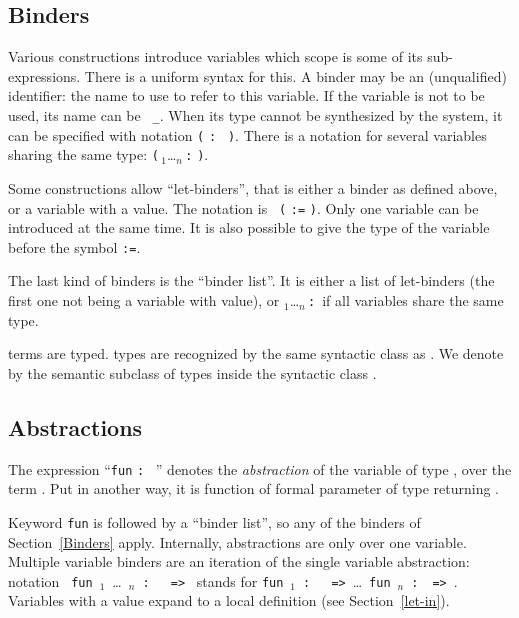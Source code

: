 \subsection{Binders
\label{Binders}
}

Various constructions introduce variables which scope is some of its
sub-expressions. There is a uniform syntax for this. A binder may be
an (unqualified) identifier: the name to use to refer to this
variable. If the variable is not to be used, its name can be {\tt
\_}. When its type cannot be synthesized by the system, it can be
specified with notation {\tt (}\,{\ident}\,{\tt :}\,{\type}\,{\tt
)}. There is a notation for several variables sharing the same type:
{\tt (}\,{\ident$_1$}\ldots{\ident$_n$}\,{\tt :}\,{\type}\,{\tt )}.

Some constructions allow ``let-binders'', that is either a binder as
defined above, or a variable with a value. The notation is {\tt
(}\,{\ident}\,{\tt :=}\,{\term}\,{\tt )}. Only one variable can be
introduced at the same time. It is also possible to give the type of
the variable before the symbol {\tt :=}.

The last kind of binders is the ``binder list''. It is either a list
of let-binders (the first one not being a variable with value), or
{\ident$_1$}\ldots{\ident$_n$}\,{\tt :}\,{\type} if all variables
share the same type.

{\Coq} terms are typed. {\Coq} types are recognized by the same
syntactic class as {\term}. We denote by {\type} the semantic subclass
of types inside the syntactic class {\term}.

\subsection{Abstractions
\label{abstractions}
}

The expression ``{\tt fun} {\ident} {\tt :} \type {\tt =>}~{\term}''
denotes the {\em abstraction} of the variable {\ident} of type
{\type}, over the term {\term}. Put in another way, it is function of
formal parameter {\ident} of type {\type} returning {\term}.

Keyword {\tt fun} is followed by a ``binder list'', so any of the
binders of Section~\ref{Binders} apply. Internally, abstractions are
only over one variable. Multiple variable binders are an iteration of
the single variable abstraction: notation {\tt
fun}~{\ident$_{1}$}~{\ldots}~{\ident$_{n}$}~{\tt :}~\type~{\tt
=>}~{\term} stands for {\tt fun}~{\ident$_{1}$}~{\tt :}~\type~{\tt
=>}~{\ldots}~{\tt fun}~{\ident$_{n}$}~{\tt :}~\type~{\tt =>}~{\term}.
Variables with a value expand to a local definition (see
Section~\ref{let-in}).

